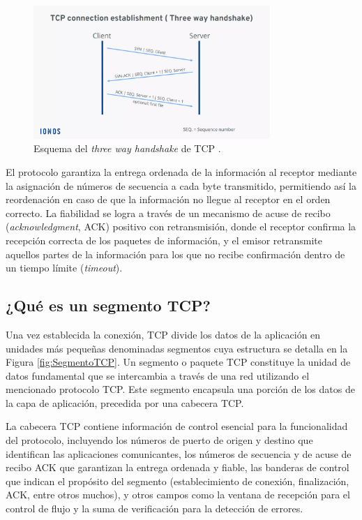 \begin{figure}[htbp]
    \centering
    \includegraphics[width=0.8\textwidth]{./img/ent-problema/EsquemaTCP.png}
    \caption{Esquema del \textit{three way handshake} de TCP \cite{tcpprotocolionos}.}
    \label{fig:EsquemaTCP}
\end{figure}

El protocolo garantiza la entrega ordenada de la información al receptor mediante la asignación de números de secuencia a cada byte transmitido, permitiendo así la reordenación en caso de que la información no llegue al receptor en el orden correcto. La fiabilidad se logra a través de un mecanismo de acuse de recibo (\textit{acknowledgment}, ACK) positivo con retransmisión, donde el receptor confirma la recepción correcta de los paquetes de información, y el emisor retransmite aquellos partes de la información para los que no recibe confirmación dentro de un tiempo límite (\textit{timeout}).

\subsection{¿Qué es un segmento TCP?}
Una vez establecida la conexión, TCP divide los datos de la aplicación en unidades más pequeñas denominadas segmentos cuya estructura se detalla en la Figura \ref{fig:SegmentoTCP}. Un segmento o paquete TCP constituye la unidad de datos fundamental que se intercambia a través de una red utilizando el mencionado protocolo TCP. Este segmento encapsula una porción de los datos de la capa de aplicación, precedida por una cabecera TCP. 

La cabecera TCP contiene información de control esencial para la funcionalidad del protocolo, incluyendo los números de puerto de origen y destino que identifican las aplicaciones comunicantes, los números de secuencia y de acuse de recibo ACK que garantizan la entrega ordenada y fiable, las banderas de control que indican el propósito del segmento (establecimiento de conexión, finalización, ACK, entre otros muchos), y otros campos como la ventana de recepción para el control de flujo y la suma de verificación para la detección de errores.



